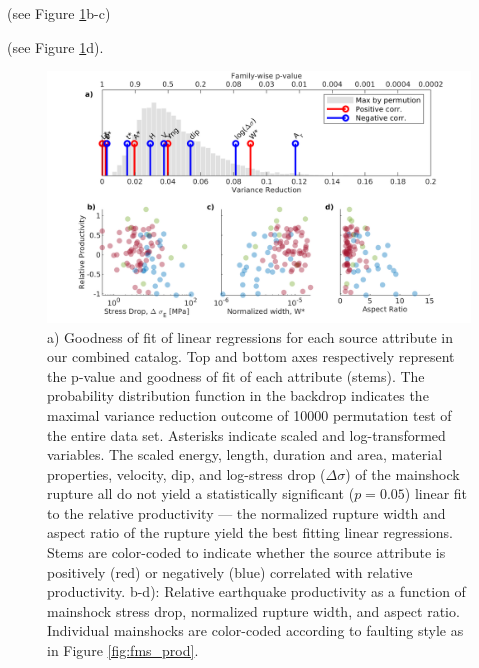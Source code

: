 \documentclass[draft, jgrga]{agujournal2018}
\begin{document}

     (see Figure \ref{fig:r2_finite_fault}b-c)

     (see Figure \ref{fig:r2_finite_fault}d).

    \begin{figure}
        \centering
        \includegraphics[width = \linewidth]{stem_plot.png}
        \caption{a) Goodness of fit of linear regressions for each source attribute in our combined catalog. Top and bottom axes respectively represent the p-value and goodness of fit of each attribute (stems). The probability distribution function in the backdrop indicates the maximal variance reduction outcome of 10000 permutation test of the entire data set. Asterisks indicate scaled and log-transformed variables. The scaled energy, length, duration and area, material properties, velocity, dip, and log-stress drop ($\Delta\sigma$) of the mainshock rupture all do not yield a statistically significant ($p=0.05$) linear fit to the relative productivity — the normalized rupture width and aspect ratio of the rupture yield the best fitting linear regressions. Stems are color-coded to indicate whether the source attribute is positively (red) or negatively (blue) correlated with relative productivity. b-d): Relative earthquake productivity as a function of mainshock stress drop, normalized rupture width, and aspect ratio. Individual mainshocks are color-coded according to faulting style as in Figure \ref{fig:fms_prod}.}
        \label{fig:r2_finite_fault}
    \end{figure}
\end{document}
